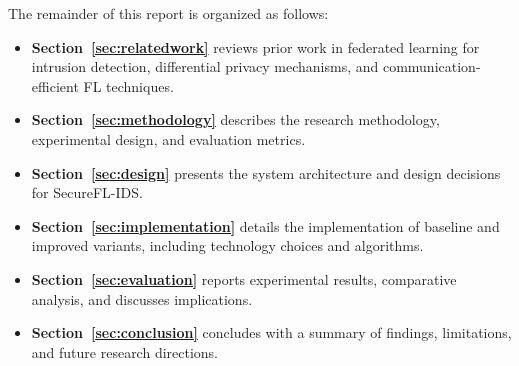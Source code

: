 The remainder of this report is organized as follows:

\begin{itemize}
    \item \textbf{Section~\ref{sec:relatedwork}} reviews prior work in federated learning for intrusion detection, differential privacy mechanisms, and communication-efficient FL techniques.
    
    \item \textbf{Section~\ref{sec:methodology}} describes the research methodology, experimental design, and evaluation metrics.
    
    \item \textbf{Section~\ref{sec:design}} presents the system architecture and design decisions for SecureFL-IDS.
    
    \item \textbf{Section~\ref{sec:implementation}} details the implementation of baseline and improved variants, including technology choices and algorithms.
    
    \item \textbf{Section~\ref{sec:evaluation}} reports experimental results, comparative analysis, and discusses implications.
    
    \item \textbf{Section~\ref{sec:conclusion}} concludes with a summary of findings, limitations, and future research directions.
\end{itemize}
